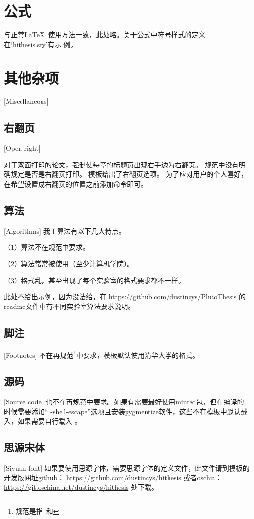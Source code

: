 \section{公式}
与正常\LaTeX\ 使用方法一致，此处略。关于公式中符号样式的定义在`hithesis.sty'有示
例。

\section{其他杂项}[Miscellaneous]

\subsection{右翻页}[Open right]

对于双面打印的论文，强制使每章的标题页出现右手边为右翻页。
规范中没有明确规定是否是右翻页打印。
模板给出了右翻页选项。
为了应对用户的个人喜好，在希望设置成右翻页的位置之前添加命令即可。

\subsection{算法}[Algorithms]
我工算法有以下几大特点。

（1）算法不在规范中要求。

（2）算法常常被使用（至少计算机学院）。

（3）格式乱，甚至出现了每个实验室的格式要求都不一样。

此处不给出示例，因为没法给，在
\href{https://github.com/dustincys/PlutoThesis}{https://github.com/dustincys/PlutoThesis}
的readme文件中有不同实验室算法要求说明。

\subsection{脚注}[Footnotes]
不在再规范\footnote{规范是指\PGR\ 和\UGR}中要求，模板默认使用清华大学的格式。

\subsection{源码}[Source code]
也不在再规范中要求。如果有需要最好使用minted包，但在编译的时候需要添加“
-shell-escape”选项且安装pygmentize软件，这些不在模板中默认载入，如果需要自行载入
。
\subsection{思源宋体}[Siyuan font]
如果要使用思源字体，需要思源字体的定义文件，此文件请到模板的开发版网址github：
\href{https://github.com/dustincys/hithesis}{https://github.com/dustincys/hithesis}
或者oschia：
\href{https://git.oschina.net/dustincys/hithesis}{https://git.oschina.net/dustincys/hithesis}
处下载。

